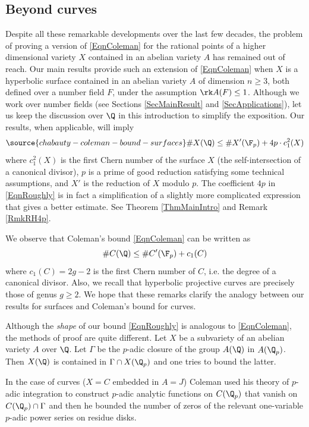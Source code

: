 
\subsection{Beyond curves} Despite all these remarkable developments over the last few decades, the problem of proving a version of \eqref{EqnColeman} for the rational points of a higher dimensional variety $X$ contained in an abelian variety $A$ has remained out of reach. Our main results provide such an extension of \eqref{EqnColeman} when $X$ is a hyperbolic surface contained in an abelian variety $A$ of dimension $n\ge 3$, both defined over a number field $F$, under the assumption $\rk A(F)\le 1$. Although we work over number fields (see Sections \ref{SecMainResult} and \ref{SecApplications}), let us keep the discussion over $\Q$ in this introduction to simplify the exposition. Our results, when applicable,  will imply
\begin{equation}\label{EqnRoughly}
\source{chabauty-coleman-bound-surfaces}
\# X(\Q) \le \# X'(\F_p) + 4p\cdot c_1^2(X)
\end{equation}
where $c_1^2(X)$ is the first Chern number of the surface $X$ (the self-intersection of a canonical divisor),  $p$ is a prime of good reduction satisfying some technical assumptions, and  $X'$ is the reduction of $X$ modulo $p$. The coefficient $4p$ in \eqref{EqnRoughly} is in fact a simplification of a slightly more complicated expression that gives a better estimate. See  Theorem \ref{ThmMainIntro} and Remark \ref{RmkRH4p}.

We observe that Coleman's bound \eqref{EqnColeman} can be written as
$$
\#C(\Q)\le  \#C'(\F_p) +c_1(C)
$$
where $c_1(C)=2g-2$ is the first Chern number of $C$, i.e. the degree of a canonical divisor. Also, we recall that hyperbolic projective curves are precisely those of genus $g\ge 2$. We hope that these remarks clarify the analogy between our results for surfaces and Coleman's bound for curves.

 Although the \emph{shape} of our bound \eqref{EqnRoughly} is analogous to \eqref{EqnColeman}, the methods of proof are quite different. Let $X$ be a subvariety of an abelian variety $A$ over $\Q$. Let  $\Gamma$ be the $p$-adic closure of the group $A(\Q)$ in $A(\Q_p)$. Then $X(\Q)$ is contained in  $\Gamma \cap X(\Q_p)$ and one tries to bound the latter.

 In the case of curves ($X=C$ embedded in $A=J$) Coleman used his theory of $p$-adic integration to construct $p$-adic analytic functions on $C(\Q_p)$ that vanish on $C(\Q_p)\cap \Gamma$ and then he bounded the number of zeros of the relevant one-variable $p$-adic power series on residue disks.

